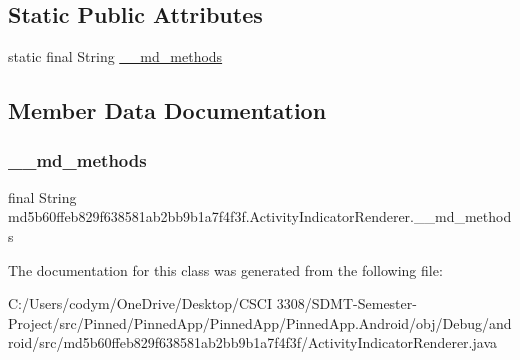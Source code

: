 \subsection*{Static Public Attributes}
\begin{DoxyCompactItemize}
\item 
static final String \hyperlink{classmd5b60ffeb829f638581ab2bb9b1a7f4f3f_1_1_activity_indicator_renderer_ab234fd2d3a2a9112481b6ec6f5f98c1d}{\+\_\+\+\_\+md\+\_\+methods}
\end{DoxyCompactItemize}


\subsection{Member Data Documentation}
\mbox{\label{classmd5b60ffeb829f638581ab2bb9b1a7f4f3f_1_1_activity_indicator_renderer_ab234fd2d3a2a9112481b6ec6f5f98c1d}} 
\subsubsection{\texorpdfstring{\+\_\+\+\_\+md\+\_\+methods}{\_\_md\_methods}}
{\footnotesize\ttfamily final String md5b60ffeb829f638581ab2bb9b1a7f4f3f.\+Activity\+Indicator\+Renderer.\+\_\+\+\_\+md\+\_\+methods\hspace{0.3cm}{\ttfamily [static]}}



The documentation for this class was generated from the following file\+:\begin{DoxyCompactItemize}
\item 
C\+:/\+Users/codym/\+One\+Drive/\+Desktop/\+C\+S\+C\+I 3308/\+S\+D\+M\+T-\/\+Semester-\/\+Project/src/\+Pinned/\+Pinned\+App/\+Pinned\+App/\+Pinned\+App.\+Android/obj/\+Debug/android/src/md5b60ffeb829f638581ab2bb9b1a7f4f3f/Activity\+Indicator\+Renderer.\+java\end{DoxyCompactItemize}
